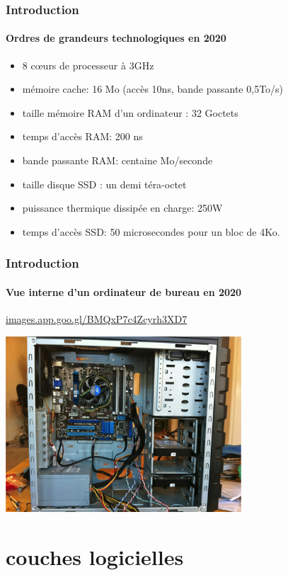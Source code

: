 \documentclass[xcolor=svgnames,final,smaller,a4]{beamer}
\begin{document}
\begin{frame}
  \frametitle{Introduction}
  \framesubtitle{Ordres de grandeurs technologiques en 2020}
 
\begin{itemize}
\item 8 c{\oe}urs de processeur à 3GHz
\item mémoire cache: 16 Mo (accès 10ns, bande passante 0,5To/s)
\item taille mémoire RAM d'un ordinateur : 32 Goctets
\item temps d'accès RAM: 200 ns
\item bande passante RAM: centaine Mo/seconde
\item taille disque SSD : un demi téra-octet
\item puissance thermique dissipée en charge: 250W
\item temps d'accès SSD: 50 microsecondes pour un bloc de 4Ko.
\end{itemize}

\end{frame}

\begin{frame}

  \frametitle{Introduction}
  \framesubtitle{Vue interne d'un ordinateur de bureau en 2020}

\href{https://images.app.goo.gl/BMQxP7c4Zcyrh3XD7}{images.app.goo.gl/BMQxP7c4Zcyrh3XD7}

\includegraphics[width=0.66\textwidth]{interieur-ordinateur.png}
\end{frame}


\section{couches logicielles}
\end{document}
